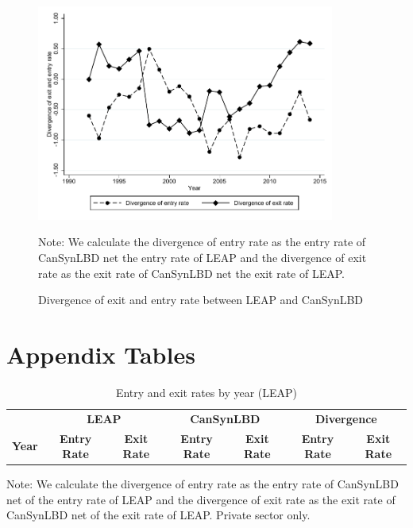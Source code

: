 \begin{figure} [H]
\centering
\caption{Divergence of exit and entry rate between LEAP and CanSynLBD} \label{Divergence}
\includegraphics[height=2.8in, width=.7\linewidth]{graphs/Divergence_of_exit_and_entry_rate_between_LEAP_and_CanSynLBD_bw.pdf} 
\begin{minipage}{0.85\textwidth}
{\footnotesize Note: \CanTableNote  We calculate the divergence of entry rate as the entry rate of CanSynLBD net the entry rate of LEAP and the divergence of exit rate as the exit rate of CanSynLBD net the exit rate of LEAP. \par}
\end{minipage}
\end{figure}

\section{Appendix Tables}
\label{sec:appendix_tables}

\begin{table}[H]
  \centering
\begin{threeparttable}
 \caption{Entry and exit rates by year (LEAP)} \label{tab:Can:FirmDynamics} \medskip
\renewcommand{\arraystretch}{1}
\begin{tabular}{l|c c| c c| c c}
\toprule
&\multicolumn{2}{c|}{\textbf{LEAP}} &  \multicolumn{2}{c|}{\textbf{CanSynLBD}}&  \multicolumn{2}{c}{\textbf{Divergence}}\\
\textbf{Year}&\textbf{Entry Rate}&\textbf{Exit Rate}&\textbf{Entry Rate}&\textbf{Exit Rate} &\textbf{Entry Rate}&\textbf{Exit Rate}\\
\midrule

   \bottomrule
  \end{tabular} 
\begin{tablenotes}
\small
\item Note: \CanTableNote  We calculate the divergence of entry rate as the entry rate of CanSynLBD net of the entry rate of LEAP and the divergence of exit rate as the exit rate of CanSynLBD net of the exit rate of LEAP. Private sector only.
 \end{tablenotes}
 \end{threeparttable}
\end{table}

